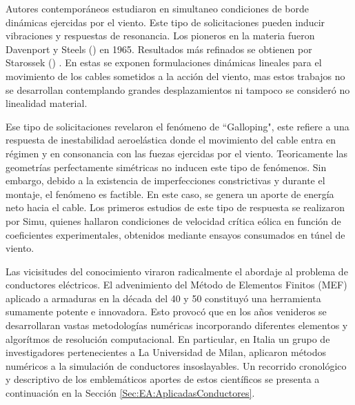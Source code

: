 Autores contemporáneos estudiaron en simultaneo condiciones de borde dinámicas ejercidas por el viento. Este tipo de solicitaciones pueden inducir vibraciones y respuestas de resonancia. Los pioneros en la materia fueron Davenport y Steels (\citep{Davenport1965}) en 1965. Resultados más refinados se obtienen por Starossek (\cite{Starossek1991}) . En estas se exponen formulaciones dinámicas lineales para el movimiento de los cables sometidos a la acción del viento, mas estos trabajos no se desarrollan contemplando grandes desplazamientos ni tampoco se consideró no linealidad material. 

Ese tipo de solicitaciones revelaron el fenómeno de ``Galloping", este refiere a una respuesta de inestabilidad aeroelástica donde el movimiento del cable entra en régimen y en consonancia con las fuezas ejercidas por el viento. Teoricamente las geometrías perfectamente simétricas no inducen este tipo de fenómenos. Sin embargo, debido a la existencia de imperfecciones constrictivas y durante el montaje, el fenómeno es factible. En este caso, se genera un aporte de energía neto hacia el cable. Los primeros estudios de este tipo de respuesta se realizaron por Simu, quienes hallaron condiciones de velocidad crítica eólica en función de coeficientes experimentales, obtenidos mediante ensayos consumados en túnel de viento. \citep{Simiu1986}

Las vicisitudes del conocimiento viraron radicalmente el abordaje al problema de conductores eléctricos. El advenimiento del Método de Elementos Finitos (MEF) aplicado a armaduras en la década del 40 y 50 constituyó una herramienta sumamente potente e innovadora. Esto provocó que en los años venideros se desarrollaran vastas metodologías numéricas incorporando diferentes elementos y algorítmos de resolución computacional. En particular, en Italia un grupo de investigadores pertenecientes a La Universidad de Milan, aplicaron métodos numéricos a la simulación de conductores insoslayables. Un recorrido cronológico y descriptivo de los emblemáticos aportes de estos científicos se presenta a continuación en la Sección \ref{Sec:EA:AplicadasConductores}.


